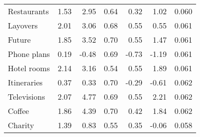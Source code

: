 \begin{tabular}[t]{lrrrrrr}
Restaurants & 1.53 & 2.95 & 0.64 & 0.32 & 1.02 & 0.060\\
Layovers & 2.01 & 3.06 & 0.68 & 0.55 & 0.55 & 0.061\\
\addlinespace
Future & 1.85 & 3.52 & 0.70 & 0.55 & 1.47 & 0.061\\
Phone plans & 0.19 & -0.48 & 0.69 & -0.73 & -1.19 & 0.061\\
Hotel rooms & 2.14 & 3.16 & 0.54 & 0.55 & 1.89 & 0.061\\
Itineraries & 0.37 & 0.33 & 0.70 & -0.29 & -0.61 & 0.062\\
Televisions & 2.07 & 4.77 & 0.69 & 0.55 & 2.21 & 0.062\\
\addlinespace
Coffee & 1.86 & 4.39 & 0.70 & 0.42 & 1.84 & 0.062\\
Charity & 1.39 & 0.83 & 0.55 & 0.35 & -0.06 & 0.058\\
\bottomrule
\end{tabular}
